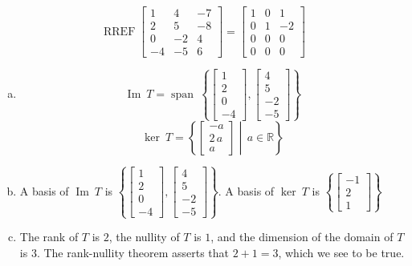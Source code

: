 \begin{exerciseAnswer} 


\[\operatorname{RREF} \left[\begin{array}{ccc}
1 & 4 & -7 \\
2 & 5 & -8 \\
0 & -2 & 4 \\
-4 & -5 & 6
\end{array}\right] = \left[\begin{array}{ccc}
1 & 0 & 1 \\
0 & 1 & -2 \\
0 & 0 & 0 \\
0 & 0 & 0
\end{array}\right] \]


\begin{enumerate}[(a)]
\item \[\operatorname{Im}\ T = \operatorname{span}\  \left\{ \left[\begin{array}{c}
1 \\
2 \\
0 \\
-4
\end{array}\right] , \left[\begin{array}{c}
4 \\
5 \\
-2 \\
-5
\end{array}\right] \right\} \]\[\operatorname{ker}\ T =  \left\{ \left[\begin{array}{c}
-a \\
2 \, a \\
a
\end{array}\right] \middle|\,a\in\mathbb{R}\right\} \]
\item  A basis of \(\operatorname{Im}\ T\) is \( \left\{ \left[\begin{array}{c}
1 \\
2 \\
0 \\
-4
\end{array}\right] , \left[\begin{array}{c}
4 \\
5 \\
-2 \\
-5
\end{array}\right] \right\} \). A basis of \(\operatorname{ker}\ T\) is \( \left\{ \left[\begin{array}{c}
-1 \\
2 \\
1
\end{array}\right] \right\} \)
\item  The rank of \(T\) is \( 2 \), the nullity of \(T\) is \( 1 \), and the dimension of the domain of \(T\) is \( 3 \). The rank-nullity theorem asserts that \( 2 + 1 = 3 \), which we see to be true. 
\end{enumerate}
    
\end{exerciseAnswer}
    
